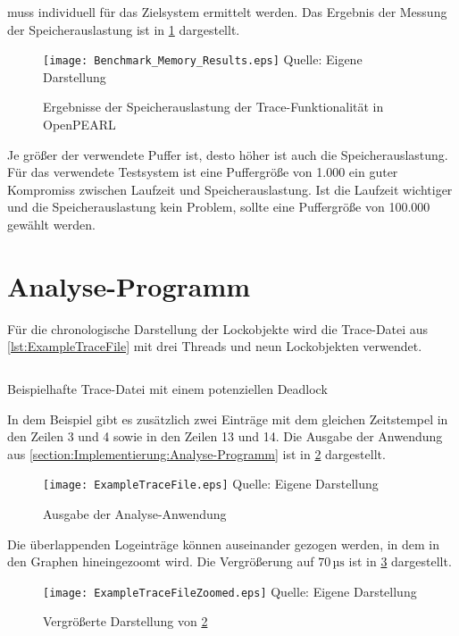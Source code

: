 muss individuell für das Zielsystem ermittelt werden. Das Ergebnis der Messung
der Speicherauslastung ist in \cref{fig:BenchmarkMemoryResults} dargestellt.
\begin{figure}[ht]
  \texttt{[image: Benchmark\_Memory\_Results.eps]}
  \footnotesize\sffamily Quelle: Eigene Darstellung
  \caption{Ergebnisse der Speicherauslastung der Trace-Funktionalität in OpenPEARL}
  \label{fig:BenchmarkMemoryResults}
\end{figure}
Je größer der verwendete Puffer ist, desto höher ist auch die
Speicherauslastung. Für das verwendete Testsystem ist eine Puffergröße von 1.000
ein guter Kompromiss zwischen Laufzeit und Speicherauslastung. Ist die Laufzeit
wichtiger und die Speicherauslastung kein Problem, sollte eine Puffergröße von
100.000 gewählt werden.

\section{Analyse-Programm}
\label{section:ValidierungAnalyseProgramm}
Für die chronologische Darstellung der Lockobjekte wird die Trace-Datei aus
\cref{lst:ExampleTraceFile} mit drei Threads und neun Lockobjekten verwendet.
\begin{listing}[ht]
  \begin{minipage}[ht]{\linewidth}
    \begin{multicols}{3}
      \inputminted[linenos]{text}{./Examples/ExampleTraceFile.log}
    \end{multicols}
    \caption{Beispielhafte Trace-Datei mit einem potenziellen Deadlock}
    \label{lst:ExampleTraceFile}
  \end{minipage}
\end{listing}
In dem Beispiel gibt es zusätzlich zwei Einträge mit dem gleichen Zeitstempel in
den Zeilen 3 und 4 sowie in den Zeilen 13 und 14. Die Ausgabe der Anwendung aus
\cref{section:Implementierung:Analyse-Programm} ist in
\cref{fig:LockTraceVisualization} dargestellt.
\begin{figure}[ht]
  \texttt{[image: ExampleTraceFile.eps]}
  \footnotesize\sffamily Quelle: Eigene Darstellung
  \caption{Ausgabe der Analyse-Anwendung}
  \label{fig:LockTraceVisualization}
\end{figure}

Die überlappenden Logeinträge können auseinander gezogen werden, in dem in den
Graphen hineingezoomt wird. Die Vergrößerung auf $70\,\textrm{µs}$ ist in
\cref{fig:LockTraceVisualizationZoomed} dargestellt.
\begin{figure}[ht]
  \texttt{[image: ExampleTraceFileZoomed.eps]}
  \footnotesize\sffamily Quelle: Eigene Darstellung
  \caption{Vergrößerte Darstellung von \cref{fig:LockTraceVisualization}}
  \label{fig:LockTraceVisualizationZoomed}
\end{figure}

